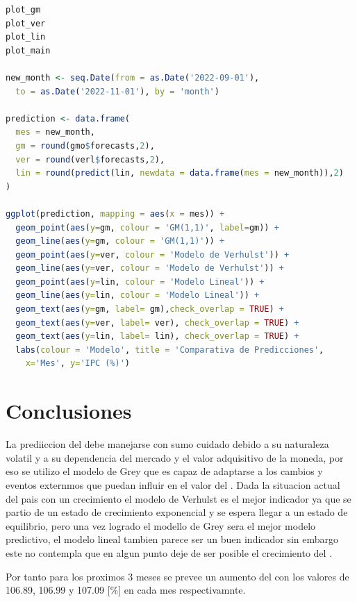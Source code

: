 \documentclass[a4paper,10pt]{article}
\begin{document}
\begin{lstlisting}[language = R]
plot_gm
plot_ver
plot_lin
plot_main

new_month <- seq.Date(from = as.Date('2022-09-01'),
  to = as.Date('2022-11-01'), by = 'month')

prediction <- data.frame(
  mes = new_month,
  gm = round(gmo$forecasts,2),
  ver = round(verl$forecasts,2),
  lin = round(predict(lin, newdata = data.frame(mes = new_month)),2)
)

ggplot(prediction, mapping = aes(x = mes)) +
  geom_point(aes(y=gm, colour = 'GM(1,1)', label=gm)) +
  geom_line(aes(y=gm, colour = 'GM(1,1)')) +
  geom_point(aes(y=ver, colour = 'Modelo de Verhulst')) +
  geom_line(aes(y=ver, colour = 'Modelo de Verhulst')) +
  geom_point(aes(y=lin, colour = 'Modelo Lineal')) +
  geom_line(aes(y=lin, colour = 'Modelo Lineal')) +
  geom_text(aes(y=gm, label= gm),check_overlap = TRUE) +
  geom_text(aes(y=ver, label= ver), check_overlap = TRUE) +
  geom_text(aes(y=lin, label= lin), check_overlap = TRUE) +
  labs(colour = 'Modelo', title = 'Comparativa de Predicciones',
    x='Mes', y='IPC (%)')

\end{lstlisting}




\section{Conclusiones}

La prediiccion del \ipc debe manejarse con sumo cuidado debido a su naturaleza volatil y a su dependencia del mercado y el valor adquisitivo de la moneda, por eso se utilizo el modelo de Grey que es capaz de adaptarse a los cambios y eventos externmos que puedan influir en el valor del \ipc. Dada la situacion actual del pais con un crecimiento el modelo de Verhulst es el mejor indicador  ya que se partio de un estado de crecimiento exponencial y se espera llegar a un estado de equilibrio, pero una vez logrado el modello de Grey sera el mejor  modelo predictivo, el modelo lineal tambien parece ser un buen indicador sin embargo este no contempla  que en algun punto deje de ser posible el crecimiento del \ipc.

Por tanto para los proximos 3 meses se prevee un aumento del \ipc con los valores de 106.89, 106.99 y 107.09 [\%] en cada mes respectivamnte.

\printbibliography
\end{document}
